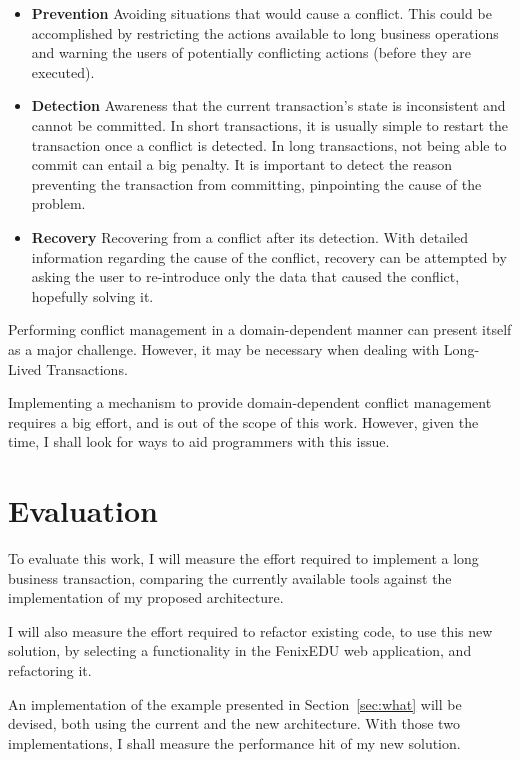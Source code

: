 \documentclass{llncs}
\begin{document}
\begin{itemize}

\item {\bf Prevention} Avoiding situations that would cause a
  conflict. This could be accomplished by restricting the actions
  available to long business operations and warning the users of
  potentially conflicting actions (before they are executed).

\item {\bf Detection} Awareness that the current transaction's state
  is inconsistent and cannot be committed. In short transactions, it
  is usually simple to restart the transaction once a conflict is
  detected. In long transactions, not being able to commit can entail
  a big penalty. It is important to detect the reason preventing the
  transaction from committing, pinpointing the cause of the problem.

\item {\bf Recovery} Recovering from a conflict after its
  detection. With detailed information regarding the cause of the
  conflict, recovery can be attempted by asking the user to
  re-introduce only the data that caused the conflict, hopefully
  solving it.

\end{itemize}

Performing conflict management in a domain-dependent manner can
present itself as a major challenge. However, it may be necessary when
dealing with Long-Lived Transactions.

Implementing a mechanism to provide domain-dependent conflict
management requires a big effort, and is out of the scope of this
work. However, given the time, I shall look for ways to aid
programmers with this issue.

\section{Evaluation}

To evaluate this work, I will measure the effort required to implement
a long business transaction, comparing the currently available tools
against the implementation of my proposed architecture.

I will also measure the effort required to refactor existing code, to
use this new solution, by selecting a functionality in the FenixEDU
web application, and refactoring it.

An implementation of the example presented in Section~\ref{sec:what}
will be devised, both using the current and the new architecture. With
those two implementations, I shall measure the performance hit of my
new solution.
\end{document}
